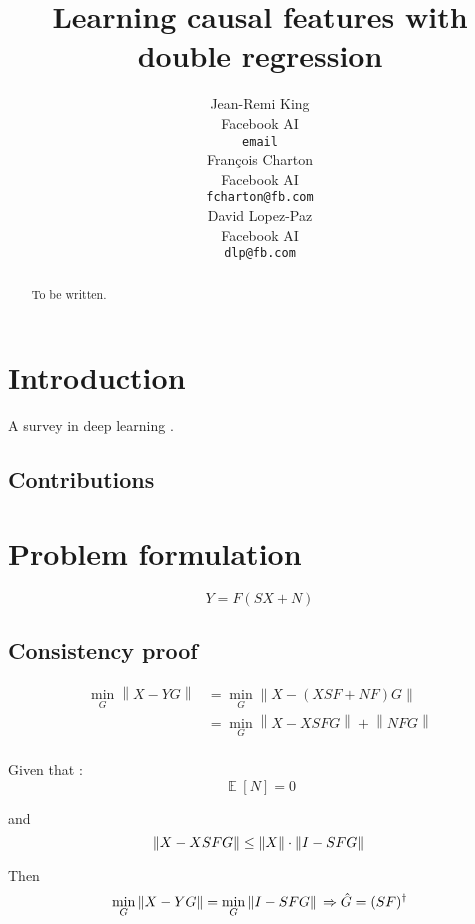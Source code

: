 \documentclass{article}
\title{Learning causal features with double regression}
\author{%
  Jean-Remi King\\
  Facebook AI\\
  \texttt{email} \\
  \And
  Fran\c{c}ois Charton\\
  Facebook AI\\
  \texttt{fcharton@fb.com}\\
  \And
  David Lopez-Paz\\
  Facebook AI\\
  \texttt{dlp@fb.com}
}
\begin{document}
\maketitle

\begin{abstract}
    To be written.
\end{abstract}

\section{Introduction}


A survey in deep learning \citep{deep_learning_nature}.

\subsection{Contributions}

\section{Problem formulation}
\begin{equation}
    Y = F(SX + N)
    \label{eq:model}
\end{equation}

\subsection{Consistency proof}

\begin{equation}
\begin{aligned}
\min_G \left \| X-YG \right \| &= \min_G \left \| X - (XSF+NF)G\right\| \\
&{}= \min_G \left \| X - XSFG\right\|  + \left \| NFG \right \| \\
\end{aligned}
\end{equation}

Given that :
\begin{equation}
\mathop{\mathbb{E}}[N]=0
\end{equation}

and
\begin{equation}
\left \| X-XSFG \right \| \leq \left \| X \right \| \cdot  \left \| I-SFG \right \| \\
\end{equation}

Then
\begin{equation}
\min_G \left \| X-YG \right \| = \min_G \left \| I -SFG\right\| \\
\Rightarrow \hat  G= (SF)^{\dagger}
\end{equation}
\end{document}
